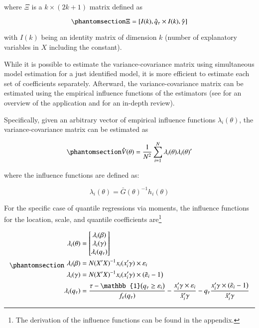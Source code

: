 \documentclass[
  authoryear,
  review,
  1p]{elsarticle}
\begin{document}
where \(\Xi\) is a \(k \times (2k+1)\) matrix defined as

\begin{equation}\phantomsection\label{eq-eqqtile}{\Xi = [ I(k), \hat q_\tau \times I(k), \hat \gamma ]
}\end{equation}

with \(I(k)\) being an identity matrix of dimension \(k\) (number of
explanatory variables in \(X\) including the constant).

While it is possible to estimate the variance-covariance matrix using
simultaneous model estimation for a just identified model, it is more
efficient to estimate each set of coefficients separately. Afterward,
the variance-covariance matrix can be estimated using the empirical
influence functions of the estimators (see \citet{jann_2020} for an
overview of the application and \citet{hampel2005} for an in-depth
review).

Specifically, given an arbitrary vector of empirical influence functions
\(\lambda_i(\theta)\), the variance-covariance matrix can be estimated
as

\begin{equation}\phantomsection\label{eq-eqvcv}{\hat{V}(\theta) = \frac{1}{N^2} \sum_{i=1}^N \lambda_i(\theta) \lambda_i(\theta)'
}\end{equation}

where the influence functions are defined as:

\[\lambda_i(\theta) = \bar G(\theta)^{-1} h_i(\theta)\]

For the specific case of quantile regressions via moments, the influence
functions for the location, scale, and quantile coefficients
are\footnote{The derivation of the influence functions can be found in
  the appendix.}

\begin{equation}\phantomsection\label{eq-ifs}{\begin{aligned}
\lambda_i(\theta)&=
  \begin{bmatrix}
  \lambda_{i}(\beta) \\
  \lambda_{i}(\gamma) \\
  \lambda_{i}(q_\tau) 
  \end{bmatrix} \\
\lambda_{i}(\beta)&=N (X'X)^{-1}  x_i ( x_i'\gamma) \times \varepsilon_i \\
\lambda_{i}(\gamma)&= N(X'X)^{-1} x_i ( x_i' \gamma ) \times (\tilde \varepsilon_i -1\big)\\
\lambda_{i}(q_\tau)&=\frac{\tau-\mathbb{1}\big( q_\tau  \geq \varepsilon_i  \big) }{f_{\varepsilon}(q_\tau)}
- \frac{ x_i'\gamma \times \varepsilon_i }{\bar x_i'\gamma} 
-  q_\tau \frac{  x_i' \gamma  \times (\tilde \varepsilon_i -1\big)}{\bar x_i'\gamma}
\end{aligned}
}\end{equation}
\end{document}
